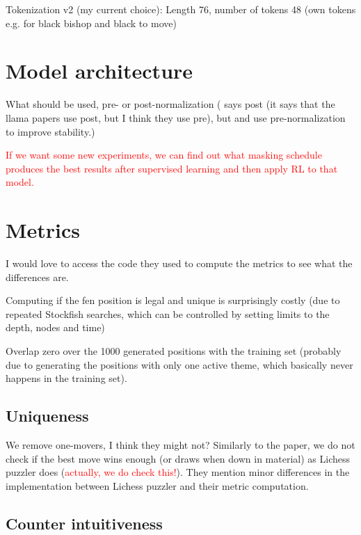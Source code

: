 \documentclass[a4paper, 12pt]{article}
\begin{document}
Tokenization v2 (my current choice): Length 76, number of tokens 48 (own tokens e.g. for black bishop and black to move)


\section{Model architecture}

What should be used, pre- or post-normalization (\cite{feng2025generatingcreativechesspuzzles} says post (it says that the llama papers use post, but I think they use pre), but \cite{touvron2023llamaopenefficientfoundation} and \cite{touvron2023llama2openfoundation} use pre-normalization to improve stability.)

\textcolor{red}{If we want some new experiments, we can find out what masking schedule produces the best results after supervised learning and then apply RL to that model.}

\section{Metrics}

I would love to access the code they used to compute the metrics to see what the differences are.

Computing if the fen position is legal and unique is surprisingly costly (due to repeated Stockfish searches, which can be controlled by setting limits to the depth, nodes and time)

Overlap zero over the 1000 generated positions with the training set (probably due to generating the positions with only one active theme, which basically never happens in the training set).

\subsection{Uniqueness}

We remove one-movers, I think they might not? Similarly to the paper, we do not check if the best move wins enough (or draws when down in material) as Lichess puzzler does (\textcolor{red}{actually, we do check this!}). They mention minor differences in the implementation between Lichess puzzler and their metric computation. 

\subsection{Counter intuitiveness}
\end{document}
